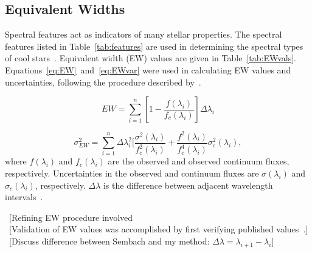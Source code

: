 \subsection{Equivalent Widths}

Spectral features act as indicators of many stellar properties.  The 
spectral features listed in Table~\ref{tab:features} 
are used in determining the spectral types of cool 
stars~\cite{Rayner_2009}.  Equivalent width (EW) 
values are given in Table~\ref{tab:EWvals}.  
Equations~\ref{eq:EW}~and~\ref{eq:EWvar} were used in calculating EW values 
and uncertainties, following the procedure described by~\cite{Cushing_2005}. 


\begin{equation}\label{eq:EW}
	EW = \sum_{i=1}^{n} [1 - \frac{f(\lambda_{i})}{f_{c}(\lambda_{i})}] \Delta\lambda_{i}
\end{equation}

\begin{equation}\label{eq:EWvar}
	\sigma_{EW}^{2} = \sum_{i=1}^{n} \Delta\lambda_{i}^{2} [\frac{\sigma^{2}(\lambda_{i})}{f_{c}^{2}(\lambda_{i})} + \frac{f^{2}(\lambda_{i})}{f_{c}^{4}(\lambda_{i})}\sigma_{c}^{2}(\lambda_{i}),
\end{equation}
where $f(\lambda_{i})$ and $f_{c}(\lambda_{i})$ are the observed 
and observed continuum fluxes, respectively.  Uncertainties in the 
observed and continuum fluxes are $\sigma(\lambda_{i})$ and 
$\sigma_{c}(\lambda_{i})$, respectively.  $\Delta\lambda$ is the 
difference between adjacent wavelength intervals~\cite{Sembach_1992}.

~[Refining EW procedure involved \\
~[Validation of EW values was accomplished by first verifying published values~\cite{Rayner_2009}.]\\
~[Discuss difference between Sembach and my method: $\Delta\lambda = \lambda_{i+1} - \lambda_{i}$]\\


